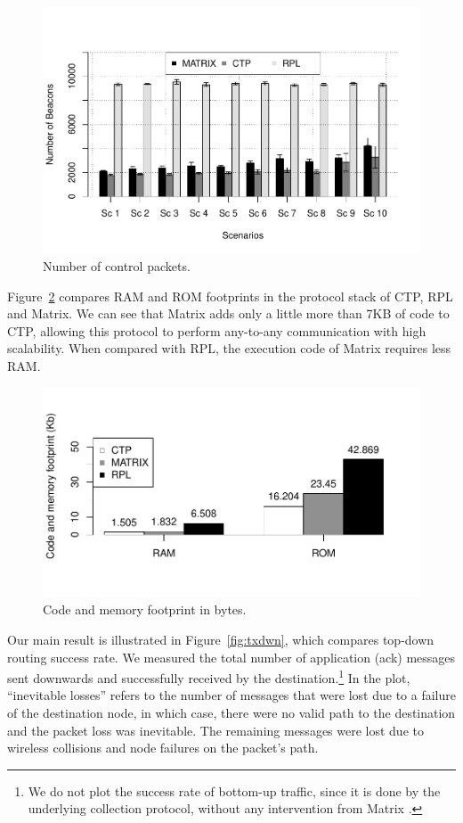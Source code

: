 \begin{figure}[h]
    \centering
    \includegraphics[width=0.95\linewidth]{Images/beacons.pdf}
    \caption{Number of control packets.}
    \label{fig:beacons}
\end{figure}

Figure~\ref{fig:footprint} compares RAM and ROM footprints in
the protocol stack of CTP, RPL and Matrix. We can see that Matrix adds only a
little more than 7KB of code to CTP, allowing this protocol to perform any-to-any communication with
high scalability. When compared with RPL, the execution code of
Matrix requires less RAM.
\begin{figure}[h]
    \centering
    \includegraphics[width=0.82\linewidth]{Images/footprint.pdf}
    \caption{Code and memory footprint in bytes.}
    \label{fig:footprint}
\end{figure}

Our main result is illustrated in Figure~\ref{fig:txdwn}, which compares
top-down routing success rate. We measured the total
number of application (ack) messages sent downwards and successfully received by
the destination.\footnote{We do not plot the success rate of bottom-up traffic,
since it is done by the underlying collection protocol, without any intervention from Matrix
.} In the plot, ``inevitable losses'' refers to the
number of messages that were lost due to a failure of the destination node, in which case, there were no
valid path to the destination and the packet loss was inevitable.
The remaining messages were lost due to wireless collisions and node failures on
the packet's path. 

